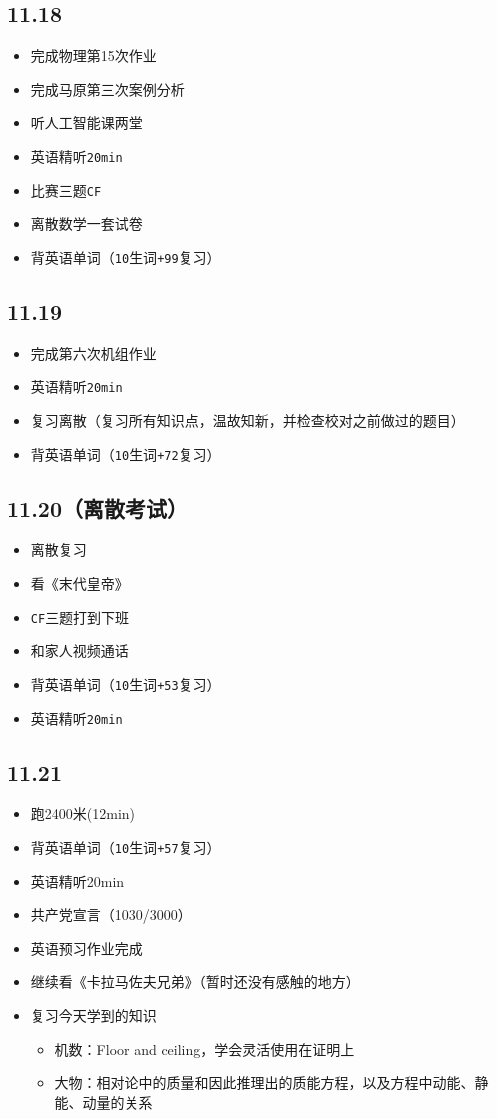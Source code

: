 \documentclass[UTF8]{ctexart}
\begin{document}
\subsection*{11.18}
\begin{itemize}
    \item 完成物理第15次作业
    \item 完成马原第三次案例分析
    \item 听人工智能课两堂
    \item 英语精听\verb|20min|
    \item 比赛三题\verb|CF|
    \item 离散数学一套试卷
    \item 背英语单词（\verb|10|生词\verb|+|\verb|99|复习）
\end{itemize}
\subsection*{11.19}
\begin{itemize}
    \item 完成第六次机组作业
    \item 英语精听\verb|20min|
    \item 复习离散（复习所有知识点，温故知新，并检查校对之前做过的题目）
    \item 背英语单词（\verb|10|生词\verb|+|\verb|72|复习）
\end{itemize}
\subsection*{11.20（离散考试）}
\begin{itemize}
    \item 离散复习
    \item 看《末代皇帝》
    \item \verb|CF|三题打到下班
    \item 和家人视频通话
    \item 背英语单词（\verb|10|生词\verb|+|\verb|53|复习）
    \item 英语精听\verb|20min|
\end{itemize}
\subsection*{11.21}
\begin{itemize}
    \item 跑2400米(12min)
    \item 背英语单词（\verb|10|生词\verb|+|\verb|57|复习）
    \item 英语精听20min
    \item 共产党宣言（1030/3000）
    \item 英语预习作业完成
    \item 继续看《卡拉马佐夫兄弟》（暂时还没有感触的地方）
    \item 复习今天学到的知识
          \begin{itemize}
              \item 机数：Floor and ceiling，学会灵活使用在证明上
              \item 大物：相对论中的质量和因此推理出的质能方程，以及方程中动能、静能、动量的关系
          \end{itemize}
\end{itemize}
\end{document}
